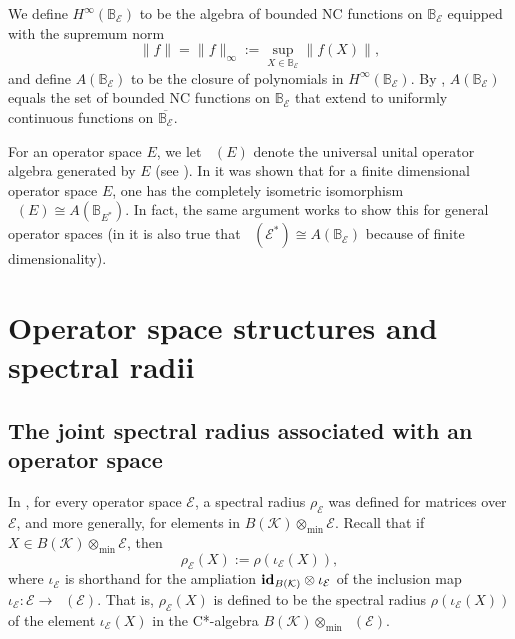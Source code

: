 \documentclass[12pt]{amsart}
\numberwithin{equation}{section}
\theoremstyle{definition}
\newcommand{\cE}{\mathcal{E}}
\newcommand{\cK}{\mathcal{K}}
\newcommand{\bB}{\mathbb{B}}
\newcommand{\ol}{\overline}
\DeclareMathOperator{\oa}{OA_u}
\DeclareMathOperator{\cmax}{C^*_{\max}}
\begin{document}
We define $H^\infty(\bB_\cE)$ to be the algebra of bounded NC functions on $\bB_\cE$ equipped with the supremum norm
\[
\|f\| = \|f\|_\infty := \sup_{X \in \bB_\cE}\|f(X)\|, 
\] 
and define $A(\bB_\cE)$ to be the closure of polynomials in $H^\infty(\bB_\cE)$. 
By \cite{SampatShalit25}, $A(\bB_\cE)$ equals the set of bounded NC functions on $\bB_\cE$ that extend to uniformly continuous functions on $\ol{\bB_\cE}$. 

For an operator space $E$, we let $\oa(E)$ denote the universal unital operator algebra generated by $E$ (see \cite[Chapter 6]{Pisier-book}). 
In \cite[Section 7.1]{SampatShalit25} it was shown that for a finite dimensional operator space $E$, one has the completely isometric isomorphism $\oa(E) \cong A(\bB_{E^*})$. 
In fact, the same argument works to show this for general operator spaces (in \cite{SampatShalit25} it is also true that $\oa(\cE^*) \cong A(\bB_{\cE})$ because of finite dimensionality).


\section{Operator space structures and spectral radii}


\subsection{The joint spectral radius associated with an operator space}

In \cite{shalsham2025spectral}, for every operator space $\cE$, a spectral radius $\rho_\cE$ was defined for matrices over $\cE$, and more generally, for elements in $B(\cK) \otimes_{\min} \cE$. 
Recall that if $X \in B(\cK) \otimes_{\min} \cE$, then
\begin{equation}\label{eq:spec_rad}
    \rho_\cE(X) := \rho(\iota_\cE(X)), 
\end{equation}
where $\iota_\cE$ is shorthand for the ampliation ${\bf id}_{B(\cK)} \otimes\iota_\cE$ of the inclusion map $\iota_\cE \colon \cE \to \cmax(\cE)$. 
That is, $\rho_\cE(X)$ is defined to be the spectral radius $\rho(\iota_\cE(X))$ of the element $\iota_\cE(X)$ in the C*-algebra $B(\cK) \otimes_{\min} \cmax(\cE)$.
\end{document}
